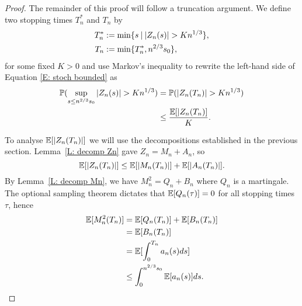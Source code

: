 \begin{proof}
    The remainder of this proof will follow a truncation argument.
    We define two stopping times $T^*_n$ and $T_n$ by
    \begin{align} 
    T^*_n &:= \min \lbrace s \: | \: |Z_n(s)| > K n^{1 / 3} \rbrace, \label{E: def T*n} \\
    T_n &:= \min \lbrace T^*_n, n^{2 / 3}s_0 \rbrace ,  \label{E: def Tn}
    \end{align}
    for some fixed $K>0$ and use Markov's inequality to rewrite the left-hand side of Equation \eqref{E: stoch bounded} as
    \begin{equation} \label{E: stoch bounded 2}
    \begin{aligned}
    \mathbb{P}( \sup_{s\leq n^{2/3} s_0} |Z_n(s)| > K n^{1 / 3} ) &= \mathbb{P}( |Z_n(T_n)| > Kn^{1 / 3} ) \\
    &\leq \frac{\mathbb{E}[|Z_n(T_n)]}{K}.
    \end{aligned} 
    \end{equation}
    
    To analyse $\mathbb{E}[|Z_n(T_n)|]$ we will use the decompositions established in the previous section. 
    Lemma~\ref{L: decomp Zn} gave $Z_n = M_n + A_n$,
    so \begin{equation} \label{E: Exp(|Zn|)}
    \mathbb{E}[|Z_n(T_n)|] \leq \mathbb{E}[|M_n(T_n)|] + \mathbb{E}[|A_n(T_n)|].
    \end{equation}
    By Lemma~\ref{L: decomp Mn}, we have $M^2_n = Q_n + B_n$ where $Q_n$ is a martingale. 
    The optional sampling theorem dictates that 
    $\mathbb{E}[Q_n(\tau)] = 0$ 
    for all stopping times $\tau$, hence 
    \begin{align*}
    \mathbb{E}[M^2_n(T_n)] 
    &= \mathbb{E}[Q_n(T_n)] + \mathbb{E}[B_n(T_n)] \\
    &= \mathbb{E}[B_n(T_n)] \\
    &= \mathbb{E}[ \int_{0}^{T_n} a_n(s)ds ] \\
    &\leq \int_{0}^{n^{2 / 3}s_0} \mathbb{E}[a_n(s)] ds.
    \end{align*}
    

\end{proof}
